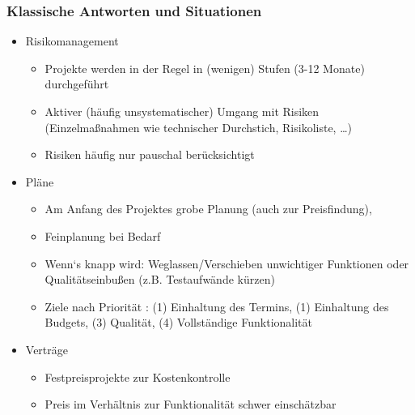  \frame
 {
   \frametitle{Klassische Antworten und Situationen}
   \begin{itemize}
   \item{Risikomanagement
    \begin{itemize}
     \item{Projekte werden in der Regel in (wenigen) Stufen (3-12 Monate) durchgeführt }
     \item{Aktiver (häufig unsystematischer) Umgang mit Risiken \\
        (Einzelmaßnahmen wie technischer Durchstich, Risikoliste, \dots)}
     \item{Risiken häufig nur pauschal berücksichtigt}
    \end{itemize}
    }
   \item{Pläne
    \begin{itemize}
     \item{Am Anfang des Projektes grobe Planung (auch zur Preisfindung), }
     \item{Feinplanung bei Bedarf}
     \item{Wenn‘s knapp wird: Weglassen/Verschieben unwichtiger Funktionen oder Qualitätseinbußen (z.B. Testaufwände kürzen)}
     \item{Ziele nach Priorität : (1) Einhaltung des Termins, (1) Einhaltung des Budgets, (3) Qualität, (4) Vollständige Funktionalität }
    \end{itemize}
    }
   \item{Verträge
    \begin{itemize}
     \item{Festpreisprojekte zur Kostenkontrolle}
     \item{Preis im Verhältnis zur Funktionalität schwer einschätzbar}
    \end{itemize}
    }
   \end{itemize}
 }
 
